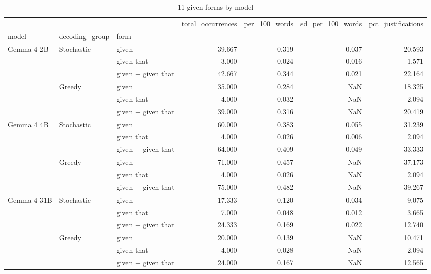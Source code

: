 \begin{table}
\caption{11 given forms by model}
\begin{tabular}{lllrrrr}
\toprule
 &  &  & total\_occurrences & per\_100\_words & sd\_per\_100\_words & pct\_justifications \\
model & decoding_group & form &  &  &  &  \\
\midrule
\multirow[t]{6}{*}{Gemma 4 2B} & \multirow[t]{3}{*}{Stochastic} & given & 39.667 & 0.319 & 0.037 & 20.593 \\
 &  & given that & 3.000 & 0.024 & 0.016 & 1.571 \\
 &  & given + given that & 42.667 & 0.344 & 0.021 & 22.164 \\
\cline{2-7}
 & \multirow[t]{3}{*}{Greedy} & given & 35.000 & 0.284 & NaN & 18.325 \\
 &  & given that & 4.000 & 0.032 & NaN & 2.094 \\
 &  & given + given that & 39.000 & 0.316 & NaN & 20.419 \\
\cline{1-7} \cline{2-7}
\multirow[t]{6}{*}{Gemma 4 4B} & \multirow[t]{3}{*}{Stochastic} & given & 60.000 & 0.383 & 0.055 & 31.239 \\
 &  & given that & 4.000 & 0.026 & 0.006 & 2.094 \\
 &  & given + given that & 64.000 & 0.409 & 0.049 & 33.333 \\
\cline{2-7}
 & \multirow[t]{3}{*}{Greedy} & given & 71.000 & 0.457 & NaN & 37.173 \\
 &  & given that & 4.000 & 0.026 & NaN & 2.094 \\
 &  & given + given that & 75.000 & 0.482 & NaN & 39.267 \\
\cline{1-7} \cline{2-7}
\multirow[t]{6}{*}{Gemma 4 31B} & \multirow[t]{3}{*}{Stochastic} & given & 17.333 & 0.120 & 0.034 & 9.075 \\
 &  & given that & 7.000 & 0.048 & 0.012 & 3.665 \\
 &  & given + given that & 24.333 & 0.169 & 0.022 & 12.740 \\
\cline{2-7}
 & \multirow[t]{3}{*}{Greedy} & given & 20.000 & 0.139 & NaN & 10.471 \\
 &  & given that & 4.000 & 0.028 & NaN & 2.094 \\
 &  & given + given that & 24.000 & 0.167 & NaN & 12.565 \\
\cline{1-7} \cline{2-7}
\bottomrule
\end{tabular}
\end{table}
